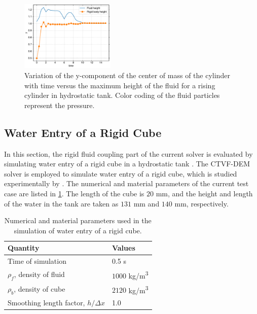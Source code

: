 \begin{figure}[!htpb]
  \centering
  \includegraphics[width=0.4\textwidth]{figures/rfc/figures/dinesh_2022_body_in_hs_tank_2d/ycom}
  \caption{Variation of the y-component of the center of mass of the cylinder
    with time versus the maximum height of the fluid for a rising cylinder in
    hydrostatic tank. Color coding of the fluid particles represent the pressure.}
\label{fig:raising-falling-solid-in-water}
\end{figure}


\FloatBarrier%
\subsection{Water Entry of a Rigid Cube}
\label{sec:falling-solid-in-water}
In this section, the rigid fluid coupling part of the current solver is
evaluated by simulating water entry of a rigid cube in a hydrostatic tank
\parencite{qiu_3d_2017}. The CTVF-DEM solver is employed to simulate water entry of
a rigid cube, which is studied experimentally by \textcite{wu_two-way_2014}. The
numerical and material parameters of the current test case are listed in
\cref{tab:rfc:qiu-falling-cube}. The length of the cube is $20$ mm, and the
height and length of the water in the tank are taken as $131$ mm and $140$ mm,
respectively.
\begin{table}[!ht]
  \centering
  \begin{tabular}[!ht]{ll}
    \toprule
    Quantity & Values\\
    \midrule
    Time of simulation & 0.5 s \\
    $\rho_f$, density of fluid & $1000$ kg/m\textsuperscript{3} \\
    $\rho_b$, density of cube & $2120$ kg/m\textsuperscript{3} \\
    Smoothing length factor, $h/\Delta x$ & 1.0\\
    \bottomrule
  \end{tabular}
  \caption{Numerical and material parameters used in the simulation of water
    entry of a rigid cube.}%
  \label{tab:rfc:qiu-falling-cube}
\end{table}


